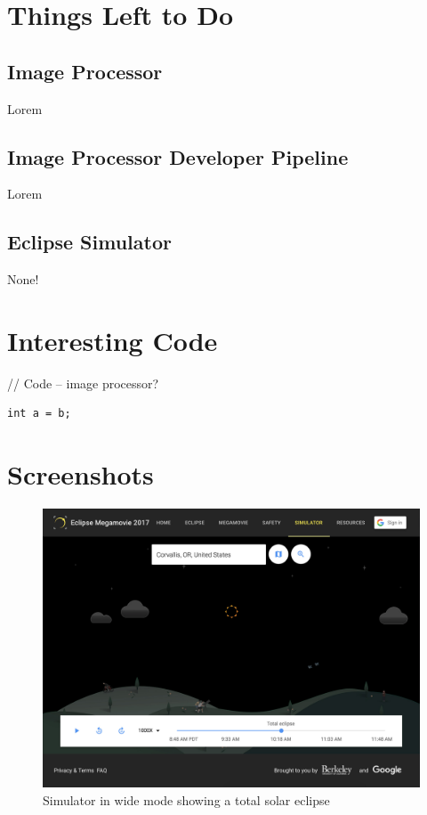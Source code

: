 \documentclass[10pt, onecolumn, draftclsnofoot, letterpaper, compsoc]{IEEEtran}
\begin{document}
\section{Things Left to Do}

\subsection{Image Processor}

Lorem \\

\subsection{Image Processor Developer Pipeline}

Lorem \\

\subsection{Eclipse Simulator}

None! \\


\newpage
\section{Interesting Code}

// Code -- image processor?

\begin{verbatim}
int a = b;
\end{verbatim}

\newpage
\section{Screenshots}

\begin{figure}[!h]
	\begin{center}
  		\includegraphics[width=\textwidth]{sim_total.eps}
		\caption{Simulator in wide mode showing a total solar eclipse}
	\end{center}
\end{figure}
\newpage
\end{document}
